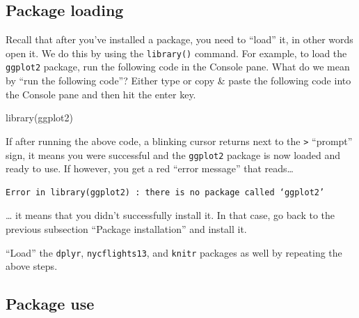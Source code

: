 \documentclass[
  letterpaper,
  DIV=11,
  numbers=noendperiod]{scrreprt}
\newenvironment{Shaded}{\begin{snugshade}}{\end{snugshade}}
\newcommand{\FunctionTok}[1]{\textcolor[rgb]{0.28,0.35,0.67}{#1}}
\newcommand{\NormalTok}[1]{\textcolor[rgb]{0.00,0.23,0.31}{#1}}
\theoremstyle{definition}
\theoremstyle{remark}
\begin{document}
\hypertarget{sec-package-loading}{%
\subsection{Package loading}\label{sec-package-loading}}

Recall that after you've installed a package, you need to ``load'' it,
in other words open it. We do this by using the \texttt{library()}
command. For example, to load the \texttt{ggplot2} package, run the
following code in the Console pane. What do we mean by ``run the
following code''? Either type or copy \& paste the following code into
the Console pane and then hit the enter key.

\begin{Shaded}
\begin{Highlighting}[]
\FunctionTok{library}\NormalTok{(ggplot2)}
\end{Highlighting}
\end{Shaded}

If after running the above code, a blinking cursor returns next to the
\texttt{\textgreater{}} ``prompt'' sign, it means you were successful
and the \texttt{ggplot2} package is now loaded and ready to use. If
however, you get a red ``error message'' that reads\ldots{}

\begin{verbatim}
Error in library(ggplot2) : there is no package called ‘ggplot2’
\end{verbatim}

\ldots{} it means that you didn't successfully install it. In that case,
go back to the previous subsection ``Package installation'' and install
it.

\begin{tcolorbox}[enhanced jigsaw, coltitle=black, toprule=.15mm, bottomtitle=1mm, breakable, leftrule=.75mm, title={{🎯} Learning Check 1.2}, opacitybacktitle=0.6, colback=white, rightrule=.15mm, opacityback=0, toptitle=1mm, colbacktitle=quarto-callout-tip-color!10!white, colframe=quarto-callout-tip-color-frame, titlerule=0mm, arc=.35mm, bottomrule=.15mm, left=2mm]
``Load'' the \texttt{dplyr}, \texttt{nycflights13}, and \texttt{knitr}
packages as well by repeating the above steps.
\end{tcolorbox}

\hypertarget{sec-package-use}{%
\subsection{Package use}\label{sec-package-use}}
\end{document}

